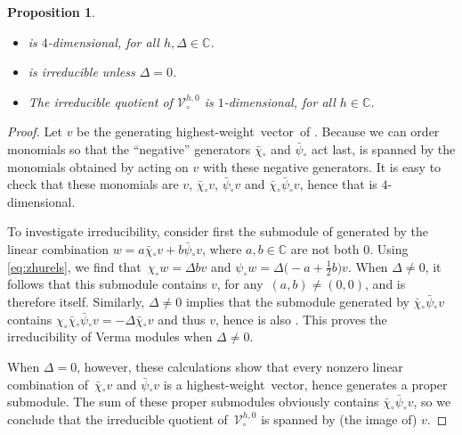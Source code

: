 \documentclass[pdftex]{sigma}
\numberwithin{equation}{section}
\newcommand{\bchi}{\bar{\chi}{}} %
\newcommand{\bpsi}{\bar{\psi}{}} %
\newcommand{\fld}[1]{\mathbb{#1}} %
\newcommand{\Mod}[1]{\mathcal{#1}} %
\newcommand{\CC}{\fld{C}}
\newcommand{\zh}[1]{#1_{\circ}} %
\newcommand{\zhver}[1]{\zh{\Mod{V}}^{#1}} %
\newcommand{\hw}{highest-weight}
\newcommand{\hwv}{\hw\ vector}
\newtheorem{Proposition}[Theorem]{Proposition}
\begin{document}
\begin{Proposition} \label{prop:vermas}
\
	\begin{itemize}\itemsep=0pt
		\item \smash{$\zhver{h,\Delta}$} is $4$-dimensional, for all $h,\Delta \in \CC$.
		\item \smash{$\zhver{h,\Delta}$} is irreducible unless $\Delta=0$.
		\item The irreducible quotient of $\zhver{h,0}$ is $1$-dimensional, for all $h\in\CC$.
	\end{itemize}
\end{Proposition}
\begin{proof}
	Let $v$ be the generating \hwv\ of \smash{$\zhver{h,\Delta}$}.
	Because we can order monomials so that the ``negative'' generators $\zh{\bchi}$ and $\zh{\bpsi}$ act last, \smash{$\zhver{h,\Delta}$} is spanned by the monomials obtained by acting on $v$ with these negative generators.
	It is easy to check that these monomials are $v$, $\zh{\bchi} v$, $\zh{\bpsi} v$ and $\zh{\bchi} \zh{\bpsi} v$, hence that \smash{$\zhver{h,\Delta}$} is $4$-dimensional.

	To investigate irreducibility, consider first the submodule of \smash{$\zhver{h,\Delta}$} generated by the linear combination $w = a \zh{\bchi} v + b \zh{\bpsi} v$, where $a,b \in \CC$ are not both $0$.
	Using \eqref{eq:zhurels}, we find that~${\zh{\chi} w = \Delta bv}$ and $\zh{\psi} w = \Delta \bigl(-a+\frac{1}{2}b\bigr) v$.
	When $\Delta \ne 0$, it follows that this submodule contains $v$, for any~${(a,b) \ne (0,0)}$, and is therefore \smash{$\zhver{h,\Delta}$} itself.
	Similarly, $\Delta \ne 0$ implies that the submodule generated by $\zh{\bchi}\zh{\bpsi} v$ contains $\zh{\chi}\zh{\bchi}\zh{\bpsi} v = -\Delta \zh{\bchi} v$ and thus $v$, hence is also \smash{$\zhver{h,\Delta}$}.
	This proves the irreducibility of Verma modules when $\Delta \ne 0$.

	When $\Delta = 0$, however, these calculations show that every nonzero linear combination of~$\zh{\bchi} v$ and $\zh{\bpsi} v$ is a \hwv, hence generates a proper submodule.
	The sum of these proper submodules obviously contains $\zh{\bchi} \zh{\bpsi} v$, so we conclude that the irreducible quotient of~$\zhver{h,0}$ is spanned by (the image of) $v$.
\end{proof}
\end{document}
